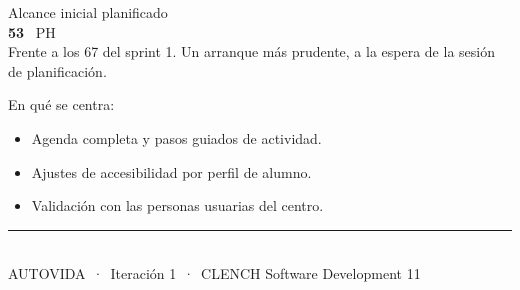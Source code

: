 \documentclass[11pt]{article}
\newcommand{\pieclaro}[1]{%
  \vfill
  {\color{cianoscuro}\rule{\textwidth}{0.4pt}}\\[0.12cm]
  {\footnotesize\color{gris} AUTOVIDA\, ·\, Iteración 1\, ·\, CLENCH Software Development
   \hfill #1}}
\begin{document}
\vspace{0.4cm}

\begin{minipage}[b]{0.44\textwidth}
{\large\color{grisclaro} Alcance inicial planificado}\\[0.3cm]
{\fontsize{60}{62}\selectfont\bfseries\color{white} 53}\ {\Large\color{grisclaro} PH}\\[0.4cm]
{\color{grisclaro} Frente a los 67 del sprint 1. Un arranque más prudente, a la espera de la sesión de planificación.}
\end{minipage}%
\hfill
\begin{minipage}[b]{0.50\textwidth}
{\color{white} En qué se centra:}\\[0.3cm]
{\small\color{grisclaro}
\begin{itemize}[label={\raisebox{0.15ex}{\color{magenta}\rule{0.42em}{0.42em}}}, itemsep=6pt]
  \item Agenda completa y pasos guiados de actividad.
  \item Ajustes de accesibilidad por perfil de alumno.
  \item Validación con las personas usuarias del centro.
\end{itemize}}
\end{minipage}

\pieclaro{11}
\end{document}
